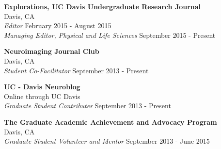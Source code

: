 \documentclass[line,margin,10pt]{res}
\begin{document}
\begin{resume}
\textbf{Explorations, UC Davis Undergraduate Research Journal}\\Davis, CA\\{\sl Editor} \hfill February 2015 - August 2015\\
{\sl Managing Editor, Physical and Life Sciences} \hfill September 2015 - Present

\textbf{Neuroimaging Journal Club}\\Davis, CA\\{\sl Student Co-Facilitator} \hfill September 2013 - Present

\textbf{UC - Davis Neuroblog}\\ Online through UC Davis\\{\sl Graduate Student Contributer} \hfill September 2013 - Present

\textbf{The Graduate Academic Achievement and Advocacy Program}\\Davis, CA\\{\sl Graduate Student Volunteer and Mentor} \hfill September 2013 - June 2015


\end{resume}
\end{document}
